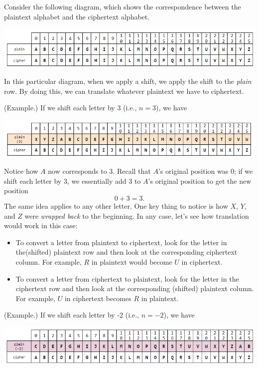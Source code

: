 \documentclass[letterpaper]{article}
\begin{document}
\bigskip 

Consider the following diagram, which shows the correspondence between the plaintext alphabet and the ciphertext alphabet.
\begin{center}
    \includegraphics[scale=0.75]{../assets/ceasar_1.png}
\end{center}
In this particular diagram, when we apply a shift, we apply the shift to the \emph{plain} row. By doing this, we can translate whatever plaintext we have to ciphertext. 

\begin{mdframed}
    (Example.) If we shift each letter by 3 (i.e., $n = 3$), we have 
    \begin{center}
        \includegraphics[scale=0.7]{../assets/ceasar_2.png}
    \end{center}
    Notice how $A$ now corresponds to 3. Recall that $A$'s original position was 0; if we shift each letter by 3, we essentially add 3 to $A$'s original position to get the new position 
    \[0 + 3 = 3.\]
    The same idea applies to any other letter. One key thing to notice is how $X$, $Y$, and $Z$ were \emph{wrapped back} to the beginning. In any case, let's see how translation would work in this case: 
    \begin{itemize}
        \item To convert a letter from plaintext to ciphertext, look for the letter in the(shifted) plaintext row and then look at the corresponding ciphertext column. For example, $R$ in plaintext would become $U$ in ciphertext. 
        \item To convert a letter from ciphertext to plaintext, look for the letter in the ciphertext row and then look at the corresponding (shifted) plaintext column. For example, $U$ in ciphertext becomes $R$ in plaintext. 
    \end{itemize}
\end{mdframed}

\begin{mdframed}
    (Example.) If we shift each letter by -2 (i.e., $n = -2$), we have 
    \begin{center}
        \includegraphics[scale=0.7]{../assets/ceasar_3.png}
    \end{center}
\end{mdframed}
\end{document}
